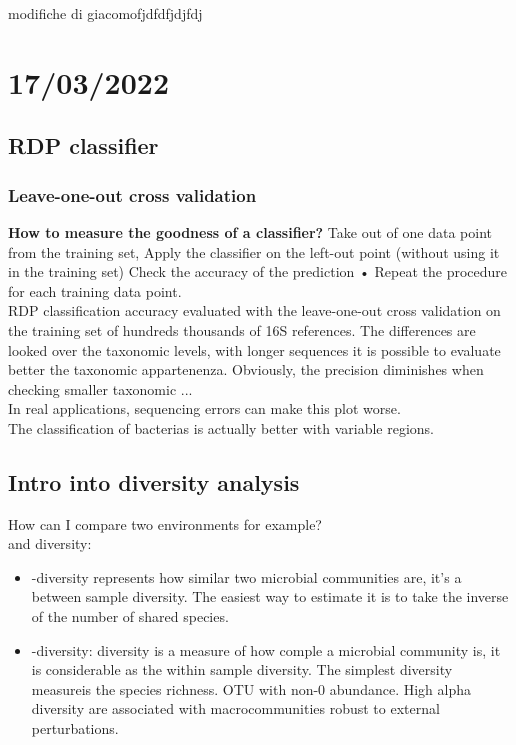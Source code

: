 \graphicspath{{chapters/images/06}}

modifiche di giacomofjdfdfjdjfdj

\chapter{17/03/2022}

\section{RDP classifier}

\subsection{Leave-one-out cross validation}

\textbf{How to measure the goodness of a classifier?}
Take out of one data point from the training set,  Apply the classifier on the left-out point (without using it in the training set) Check the accuracy of the prediction
• Repeat the procedure for each training data point. 
\\
RDP classification accuracy evaluated with the leave-one-out
cross validation on the training set of hundreds thousands of 16S
references. The differences are looked over the taxonomic levels, with longer sequences it is possible to evaluate better the taxonomic appartenenza. Obviously, the precision diminishes when checking smaller taxonomic ... %
\\
In real applications, sequencing errors can make this plot worse. 
\\
The classification of bacterias is actually better with variable regions. 

\section{Intro into diversity analysis}

How can I compare two environments for example?
\\
\alpha and \beta diversity: 

\begin{itemize}
	\item \beta -diversity represents how similar two microbial communities are, it's a between sample diversity. The easiest way to estimate it is to take the inverse of the number of shared species.  
	\item \alpha -diversity:  diversity is a measure of how comple a microbial community is, it is considerable as the within sample diversity. The simplest \alpha diversity measureis the species richness. OTU with non-0 abundance. High alpha diversity are associated with macrocommunities robust to external perturbations. 
\end{itemize}


